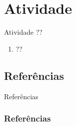 \documentclass{beamer}
\begin{document}
   \section{Atividade} 
   \begin{frame}{Atividade}
	??
	\begin{enumerate}
	    \item  ??
	\end{enumerate}
	
    \end{frame}
   \subsection{Referências}
    \begin{frame}{Referências}%
\frametitle{Referências}
\small
\begin{center}
\tiny


\end{center}
\end{frame}
\end{document}
